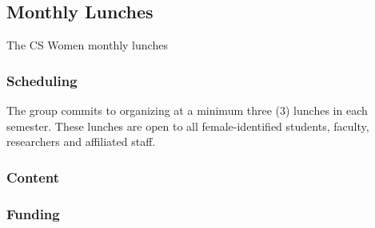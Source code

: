 \subsection{Monthly Lunches}
\label{sec:lunches}

The CS Women monthly lunches 

\subsubsection{Scheduling}
\label{sec:lunches_scheduling}
The group commits to organizing at a minimum three (3) lunches in each semester. These lunches are open to all female-identified students, faculty, researchers and affiliated staff.

\subsubsection{Content}
\label{sec:lunches_content}

\subsubsection{Funding}
\label{sec:lunches_funding}
